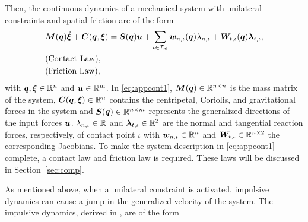 \documentclass[../DC2017114Bouma.tex]{subfiles}
\begin{document}
Then, the continuous dynamics of a mechanical system with unilateral constraints and spatial friction are of the form
\begin{align}
&{\boldsymbol{M}}({\boldsymbol{q}})\dot{\boldsymbol{\xi}} + {\boldsymbol{C}}({\boldsymbol{q}},\boldsymbol{\xi}) = {\boldsymbol{S}}({\boldsymbol{q}}){\boldsymbol{u}} + \sum_{\iota\in\mathcal{I}_{\text{cl}}}{\boldsymbol{w}}_{n,\iota}({\boldsymbol{q}})\lambda_{n,\iota} + {\boldsymbol{W}}_{t,\iota}({\boldsymbol{q}})\boldsymbol{\lambda}_{t,\iota}, \label{eq:appcont1}\\
&\text{(Contact Law)},\nonumber\\
&\text{(Friction Law)},\nonumber
\end{align}
%
%
%
%
%
%
%
with ${\boldsymbol{q}},\boldsymbol{\xi}\in\mathbb{R}^{n}$ and ${\boldsymbol{u}}\in\mathbb{R}^m$. In \eqref{eq:appcont1}, ${\boldsymbol{M}}({\boldsymbol{q}})\in\mathbb{R}^{n\times n}$ is the mass matrix of the system, ${\boldsymbol{C}}({\boldsymbol{q}},\boldsymbol{\xi})\in\mathbb{R}^{n}$ contains the centripetal, Coriolis, and gravitational forces in the system and ${\boldsymbol{S}}({\boldsymbol{q}})\in\mathbb{R}^{n\times m}$ represents the generalized directions of the input forces ${\boldsymbol{u}}$. $\lambda_{n,\iota}\in\mathbb{R}$ and $\boldsymbol{\lambda}_{t,\iota}\in\mathbb{R}^{2}$ are the normal and tangential reaction forces, respectively, of contact point $\iota$ with ${\boldsymbol{w}}_{n,\iota}\in\mathbb{R}^{n}$ and ${\boldsymbol{W}}_{t,\iota}\in\mathbb{R}^{n\times 2}$ the corresponding Jacobians. To make the system description in \eqref{eq:appcont1} complete, a contact law and friction law is required. These laws will be discussed in Section~\ref{sec:comp}.

As mentioned above, when a unilateral constraint is activated, impulsive dynamics can cause a jump in the generalized velocity of the system. The impulsive dynamics, derived in \cite[Section 5.4]{Leine2008}, are of the form
\end{document}
